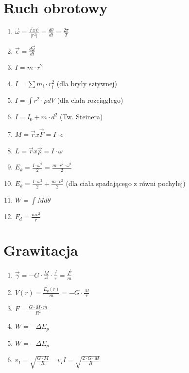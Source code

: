 \documentclass[12pt,twoside,a4paper]{book}
\begin{document}
\section{Ruch obrotowy}
\begin{enumerate}
\item$\overrightarrow{\omega} = \frac{\overrightarrow{r} x \overrightarrow{v}}{|r^2|} = \frac{d \theta}{dt} = \frac{2 \pi}{T}$
\item$\overrightarrow{\epsilon} = \frac{d\overrightarrow{\omega}}{dt}$
\item$I = m \cdot r^2$
\item$I = \sum m_i \cdot r_{i}^{2}$ (dla bryły sztywnej)
\item$I = \int r^2 \cdot \rho dV$ (dla ciała rozciągłego)
\item$I = I_0 + m \cdot d^2$ (Tw. Steinera)
\item$M = \overrightarrow{r} x \overrightarrow{F} = I \cdot \epsilon$
\item$L = \overrightarrow{r} x \overrightarrow{p} = I \cdot \omega$
\item$E_k = \frac{I \cdot \omega^2}{2} = \frac{m \cdot r^2 \cdot \omega^2}{2}$
\item$E_k = \frac{I \cdot \omega^2}{2} + \frac{m \cdot v^2}{2}$ (dla ciała spadającego z równi pochyłej)
\item$W = \int M d \theta$
\item$F_d=\frac{mv^2}{r}$
\end{enumerate}
\section{Grawitacja}
\begin{enumerate}
\item$\overrightarrow{\gamma} = -G \cdot \frac{M}{r^2} \cdot \frac{\overrightarrow{r}}{r} = \frac{\overrightarrow{F}}{m}$
\item$V(r) = \frac{E_p(r)}{m} = -G \cdot \frac{M}{r}$
\item$F = \frac{G \cdot M \cdot m}{R^2}$
\item$W = - \Delta E_p$
\item$W = - \Delta E_p$
\item$v_I = \sqrt{\frac{G \cdot M}{R}}$ ~ $v_II = \sqrt{\frac{2 \cdot G \cdot M}{R}}$
\end{enumerate}


\end{document}
